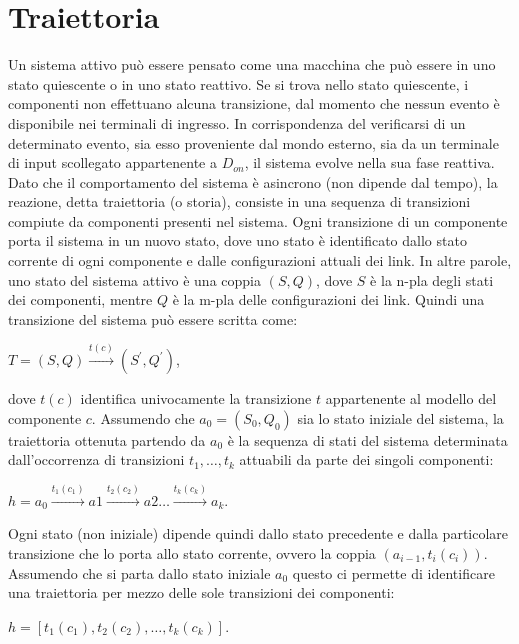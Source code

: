 \section{Traiettoria}
Un sistema attivo può essere pensato come una macchina che può essere in uno stato quiescente o in uno stato reattivo. Se si trova nello stato quiescente, i componenti non effettuano alcuna transizione, dal momento che nessun evento è disponibile nei terminali di ingresso. In corrispondenza del verificarsi di un determinato evento, sia esso proveniente dal mondo esterno, sia da un terminale di input scollegato appartenente a $D_{on}$, il sistema evolve nella sua fase reattiva. Dato che il comportamento del sistema è asincrono (non dipende dal tempo), la reazione, detta traiettoria (o storia), consiste in una sequenza di transizioni compiute da componenti presenti nel sistema.
Ogni transizione di un componente porta il sistema in un nuovo stato, dove uno stato è identificato dallo stato corrente di ogni componente e dalle configurazioni attuali dei link. In altre parole, uno stato del sistema attivo è una coppia $(S,Q)$, dove $S$ è la n-pla degli stati dei componenti, mentre $Q$ è la m-pla delle configurazioni dei link.
Quindi una transizione del sistema può essere scritta come:
\begin{center}
	$T = (S,Q) \xrightarrow {t(c)} (S^\prime,Q^\prime)$,
\end{center}
dove $t(c)$ identifica univocamente la transizione $t$ appartenente al modello del componente $c$.
Assumendo che $a_0 = (S_0,Q_0)$ sia lo stato iniziale del sistema, la traiettoria ottenuta partendo da $a_0$ è la sequenza di stati del sistema determinata dall'occorrenza di transizioni $t_1, \ldots , t_k$ attuabili da parte dei singoli componenti:
\begin{center}
$h = a_0 \xrightarrow{t_1(c_1)} a1 \xrightarrow{t_2(c_2)} a2 \ldots \xrightarrow{t_k(c_k)} a_k$.
\end{center}

Ogni stato (non iniziale) dipende quindi dallo stato precedente e dalla particolare transizione che lo porta allo stato corrente, ovvero la coppia $(a_{i-1},t_i(c_i))$. Assumendo che si parta dallo stato iniziale $a_0$ questo ci permette di identificare una traiettoria per mezzo delle sole transizioni dei componenti:
\begin{center}
$h = [t_1(c_1),t_2(c_2), \ldots , t_k(c_k)]$.
\end{center}


